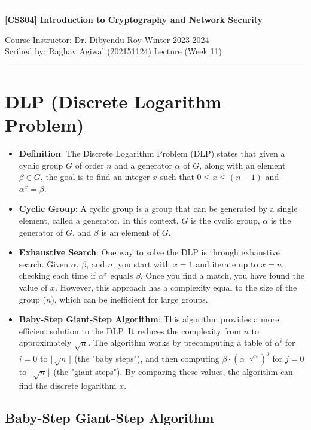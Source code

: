 \documentclass[11pt]{article}
\begin{document}
\noindent
\rule{\textwidth}{1pt}
\begin{center}
{\bf [CS304] Introduction to Cryptography and Network Security}
\end{center}
Course Instructor: Dr. Dibyendu Roy \hfill Winter 2023-2024\\
Scribed by: Raghav Agiwal (202151124) \hfill Lecture (Week 11)
\\
\rule{\textwidth}{1pt}


\section{DLP (Discrete Logarithm Problem)}
\begin{itemize}
    \item \textbf{Definition}: The Discrete Logarithm Problem (DLP) states that given a cyclic group $G$ of order $n$ and a generator $\alpha$ of $G$, along with an element $\beta \in G$, the goal is to find an integer $x$ such that $0 \leq x \leq (n-1)$ and $\alpha^x = \beta$.
    \item \textbf{Cyclic Group}: A cyclic group is a group that can be generated by a single element, called a generator. In this context, $G$ is the cyclic group, $\alpha$ is the generator of $G$, and $\beta$ is an element of $G$.
    \item \textbf{Exhaustive Search}: One way to solve the DLP is through exhaustive search. Given $\alpha$, $\beta$, and $n$, you start with $x = 1$ and iterate up to $x = n$, checking each time if $\alpha^x$ equals $\beta$. Once you find a match, you have found the value of $x$. However, this approach has a complexity equal to the size of the group ($n$), which can be inefficient for large groups.
    \item \textbf{Baby-Step Giant-Step Algorithm}: This algorithm provides a more efficient solution to the DLP. It reduces the complexity from $n$ to approximately $\sqrt{n}$. The algorithm works by precomputing a table of $\alpha^i$ for $i = 0$ to $\lfloor \sqrt{n} \rfloor$ (the "baby steps"), and then computing $\beta \cdot (\alpha^{-\sqrt{n}})^j$ for $j = 0$ to $\lfloor \sqrt{n} \rfloor$ (the "giant steps"). By comparing these values, the algorithm can find the discrete logarithm $x$.
\end{itemize}


\subsection{Baby-Step Giant-Step Algorithm}
\end{document}
